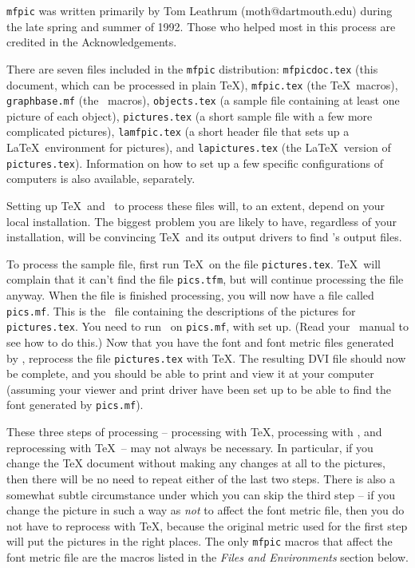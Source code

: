 
{\tt mfpic} was written primarily by Tom Leathrum
(moth@dartmouth.edu) during the late spring and summer of
1992.  Those who helped most in this process are credited
in the Acknowledgements.


There are seven files included in the {\tt mfpic}
distribution:  {\tt mfpicdoc.tex} (this document, which
can be processed in plain \TeX), {\tt mfpic.tex} (the
\TeX\ macros), {\tt graphbase.mf} (the \MF\ macros), 
{\tt objects.tex} (a sample file containing at least one
picture of each object), {\tt pictures.tex} (a short
sample file with a few more complicated pictures), 
{\tt lamfpic.tex} (a short header file that sets up a 
\LaTeX\ environment for pictures), and 
{\tt lapictures.tex} (the \LaTeX\ version of 
{\tt pictures.tex}).  Information on how to set up a few
specific configurations of computers is also available,
separately.


Setting up \TeX\ and \MF\ to process these files will, to
an extent, depend on your local installation.  The
biggest problem you are likely to have, regardless of
your installation, will be convincing \TeX\ and its
output drivers to find \MF's output files.

To process the sample file, first run \TeX\ on the file
{\tt pictures.tex}.  \TeX\ will complain that it can't
find the file {\tt pics.tfm}, but will continue
processing the file anyway.  When the file is finished
processing, you will now have a file called 
{\tt pics.mf}.  This is the \MF\ file containing the
descriptions of the pictures for {\tt pictures.tex}.  You
need to run \MF\ on {\tt pics.mf}, with
 set up.  (Read your \MF\ manual to
see how to do this.) Now that you have the font and font
metric files generated by \MF, reprocess the file 
{\tt pictures.tex} with \TeX.  The resulting DVI file
should now be complete, and you should be able to print
and view it at your computer (assuming your viewer and
print driver have been set up to be able to find the font
generated by {\tt pics.mf}).

These three steps of processing -- processing with \TeX,
processing with \MF, and reprocessing with \TeX\ -- may
not always be necessary.  In particular, if you change
the TeX document without making any changes at all to the
pictures, then there will be no need to repeat either of
the last two steps.  There is also a somewhat subtle
circumstance under which you can skip the third step --
if you change the picture in such a way as {\it not} to
affect the font metric file, then you do not have to
reprocess with \TeX, because the original metric used for
the first step will put the pictures in the right places.
The only {\tt mfpic} macros that affect the font metric
file are the macros listed in the {\sl Files and
Environments} section below.

